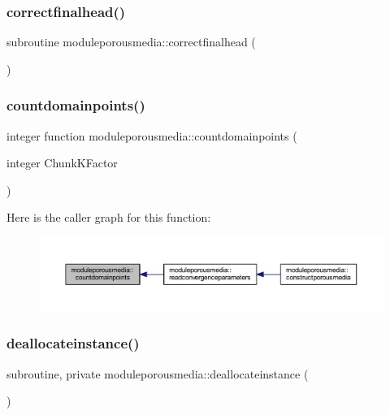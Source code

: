 \subsubsection{\texorpdfstring{correctfinalhead()}{correctfinalhead()}}
{\footnotesize\ttfamily subroutine moduleporousmedia\+::correctfinalhead (\begin{DoxyParamCaption}{ }\end{DoxyParamCaption})\hspace{0.3cm}{\ttfamily [private]}}

\mbox{\label{namespacemoduleporousmedia_a0fc4ab39d44c6c2942e125f98c3a3466}} 
\subsubsection{\texorpdfstring{countdomainpoints()}{countdomainpoints()}}
{\footnotesize\ttfamily integer function moduleporousmedia\+::countdomainpoints (\begin{DoxyParamCaption}\item[{integer}]{Chunk\+K\+Factor }\end{DoxyParamCaption})\hspace{0.3cm}{\ttfamily [private]}}

Here is the caller graph for this function\+:\nopagebreak
\begin{figure}[H]
\begin{center}
\leavevmode
\includegraphics[width=350pt]{namespacemoduleporousmedia_a0fc4ab39d44c6c2942e125f98c3a3466_icgraph}
\end{center}
\end{figure}
\mbox{\label{namespacemoduleporousmedia_a7941341d1b0822b150125db812b3fc76}} 
\subsubsection{\texorpdfstring{deallocateinstance()}{deallocateinstance()}}
{\footnotesize\ttfamily subroutine, private moduleporousmedia\+::deallocateinstance (\begin{DoxyParamCaption}{ }\end{DoxyParamCaption})\hspace{0.3cm}{\ttfamily [private]}}

